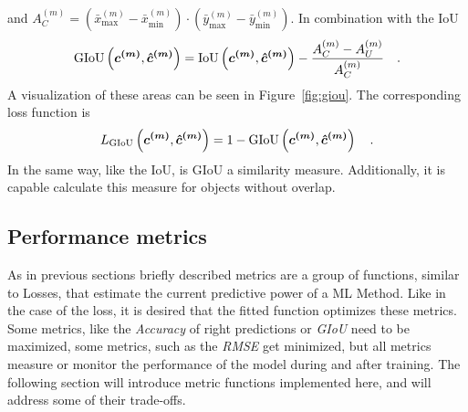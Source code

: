and $A^{(m)}_C = (\bar{x}^{(m)}_{\max} - \bar{x}^{(m)}_{\min}) \cdot (\bar{y}^{(m)}_{\max} - \bar{y}^{(m)}_{\min})$. In combination with the IoU
\begin{align}
    \text{GIoU}\left(
        \bm{c^{(m)}},
        \bm{\hat{c}^{(m)}}
    \right) =
    \text{IoU}\left(
        \bm{c^{(m)}},
        \bm{\hat{c}^{(m)}}
    \right)
    - \frac{A^{(m)}_C - A^{(m)}_U}{A^{(m)}_C}\quad.
    \label{eq:giou}
\end{align}
A visualization of these areas can be seen in Figure~\ref{fig:giou}.
The corresponding loss function is
\begin{align}
    L_{\text{GIoU}}
    \left(
        \bm{c^{(m)}},
        \bm{\hat{c}^{(m)}}
    \right) = 1 - \text{GIoU}\left(
        \bm{c^{(m)}},
        \bm{\hat{c}^{(m)}}
    \right)\quad .
\end{align}
In the same way, like the IoU, is GIoU a similarity measure.
Additionally, it is capable calculate this measure for objects without overlap.
\subsection{Performance metrics}\label{subsec:metrics}
As in previous sections briefly described metrics are a group of functions, similar to Losses, that estimate the current predictive power of a ML Method.
Like in the case of the loss, it is desired that the fitted function optimizes these metrics.
Some metrics, like the \textit{Accuracy} of right predictions or \textit{GIoU} need to be maximized, some metrics, such as the \textit{RMSE} get minimized, but all metrics measure or monitor the performance of the model during and after training.
The following section will introduce metric functions implemented here, and will address some of their trade-offs.


